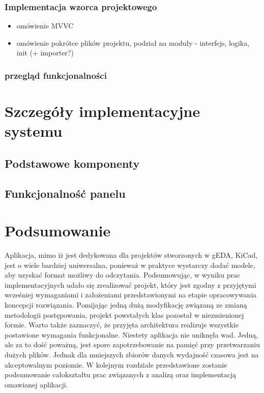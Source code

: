 \documentclass[brudnopis]{xmgr}
\begin{document}
\subsection{Implementacja wzorca projektowego}
\begin{itemize}
\item omówienie MVVC
\item omówienie pokrótce plików projektu, podział na moduły - interfejs, logika, init (+ importer?)
\end{itemize}

\subsection{przegląd funkcjonalności}



\chapter{Szczegóły implementacyjne systemu}
\section{Podstawowe komponenty}
\section{Funkcjonalność panelu}

\chapter{Podsumowanie}

Aplikacja,  mimo  iż  jest  dedykowana  dla  projektów stworzonych w gEDA, KiCad,  jest  o  wiele  bardziej uniwersalna, ponieważ w praktyce wystarczy dodać modele, aby uzyskać format możliwy do odczytania. Podsumowując,  w  wyniku  prac  implementacyjnych  udało  się  zrealizować projekt,  który  jest  zgodny  z  przyjętymi  wcześniej  wymaganiami  i  założeniami przedstawionymi  na  etapie  opracowywania  koncepcji  rozwiązania.  Pomijając  jedną dużą modyfikację związaną ze zmianą metodologii postępowania, projekt powstałych klas pozostał w niezmienionej formie. Warto także zaznaczyć, że przyjęta architektura realizuje   wszystkie   postawione   wymagania   funkcjonalne.   Niestety   aplikacja   nie uniknęła wad. Jedną, ale za to dość poważną, jest spore zapotrzebowanie na pamięć przy przetwarzaniu dużych plików. Jednak dla mniejszych zbiorów danych wydajność czasowa jest na akceptowalnym poziomie. W  kolejnym  rozdziale  przedstawione  zostanie  podsumowanie całokształtu prac związanych z analizą oraz implementacją omawianej aplikacji.
\end{document}
